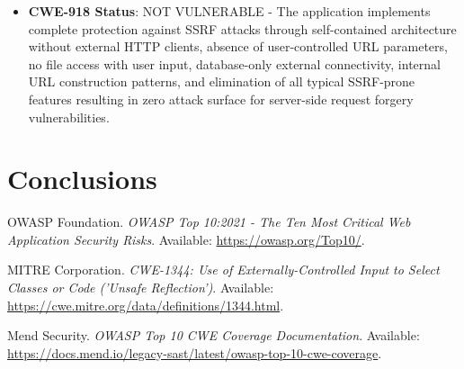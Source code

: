 \documentclass[]{UCD_CS_FYP_Report}
\begin{document}
\begin{itemize}
	\item \textbf{CWE-918 Status}: NOT VULNERABLE - The application implements complete protection against SSRF attacks through self-contained architecture without external HTTP clients, absence of user-controlled URL parameters, no file access with user input, database-only external connectivity, internal URL construction patterns, and elimination of all typical SSRF-prone features resulting in zero attack surface for server-side request forgery vulnerabilities.
\end{itemize}



\chapter{Conclusions}



\newpage
\begin{thebibliography}{99}
 OWASP Foundation. \emph{OWASP Top 10:2021 - The Ten Most Critical Web Application Security Risks}. Available: \url{https://owasp.org/Top10/}.

 MITRE Corporation. \emph{CWE-1344: Use of Externally-Controlled Input to Select Classes or Code ('Unsafe Reflection')}. Available: \url{https://cwe.mitre.org/data/definitions/1344.html}.

 Mend Security. \emph{OWASP Top 10 CWE Coverage Documentation}. Available: \url{https://docs.mend.io/legacy-sast/latest/owasp-top-10-cwe-coverage}.
\end{thebibliography}
\label{endpage}
\end{document}
